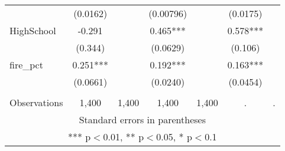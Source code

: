 \begin{tabular}{lcccccc}
 & (0.0162) &  & (0.00796) &  & (0.0175) &  \\
HighSchool & -0.291 &  & 0.465*** &  & 0.578*** &  \\
 & (0.344) &  & (0.0629) &  & (0.106) &  \\
fire\_pct & 0.251*** &  & 0.192*** &  & 0.163*** &  \\
 & (0.0661) &  & (0.0240) &  & (0.0454) &  \\
 &  &  &  &  &  &  \\
 Observations & 1,400 & 1,400 & 1,400 & 1,400 & . & . \\ \hline
\multicolumn{7}{c}{ Standard errors in parentheses} \\
\multicolumn{7}{c}{ *** p$<$0.01, ** p$<$0.05, * p$<$0.1} \\
\end{tabular}
